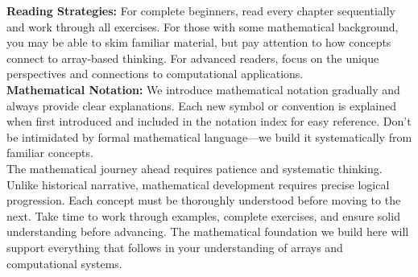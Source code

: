 \textbf{Reading Strategies:} For complete beginners, read every chapter sequentially and work through all exercises. For those with some mathematical background, you may be able to skim familiar material, but pay attention to how concepts connect to array-based thinking. For advanced readers, focus on the unique perspectives and connections to computational applications.\\
\textbf{Mathematical Notation:} We introduce mathematical notation gradually and always provide clear explanations. Each new symbol or convention is explained when first introduced and included in the notation index for easy reference. Don't be intimidated by formal mathematical language—we build it systematically from familiar concepts.\\
The mathematical journey ahead requires patience and systematic thinking. Unlike historical narrative, mathematical development requires precise logical progression. Each concept must be thoroughly understood before moving to the next. Take time to work through examples, complete exercises, and ensure solid understanding before advancing. The mathematical foundation we build here will support everything that follows in your understanding of arrays and computational systems.